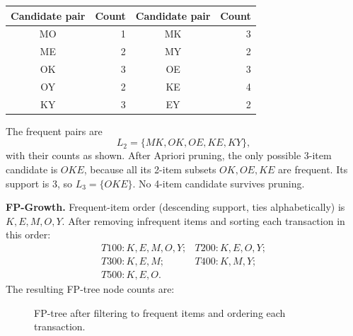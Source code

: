\documentclass[11pt,a4paper]{article}
\begin{document}
\begin{center}
\small
\begin{tabular}{c|r@{\qquad}c|r}
\toprule
Candidate pair & Count & Candidate pair & Count\\
\midrule
MO&1& MK&3\\
ME&2& MY&2\\
OK&3& OE&3\\
OY&2& KE&4\\
KY&3& EY&2\\
\bottomrule
\end{tabular}
\end{center}
The frequent pairs are
\[
L_2=\{MK,OK,OE,KE,KY\},
\]
with their counts as shown. After Apriori pruning, the only possible 3-item candidate is \(OKE\), because all its 2-item subsets \(OK,OE,KE\) are frequent. Its support is 3, so \(L_3=\{OKE\}\). No 4-item candidate survives pruning.

\textbf{FP-Growth.} Frequent-item order (descending support, ties alphabetically) is
\(K,E,M,O,Y\). After removing infrequent items and sorting each transaction in this order:
\[
\begin{array}{ll}
T100:K,E,M,O,Y;&T200:K,E,O,Y;\\
T300:K,E,M;&T400:K,M,Y;\\
T500:K,E,O.&
\end{array}
\]
The resulting FP-tree node counts are:

\begin{figure}[H]
\centering
{}
\caption{FP-tree after filtering to frequent items and ordering each transaction.}
\label{fig:fptree}
\end{figure}
\end{document}

